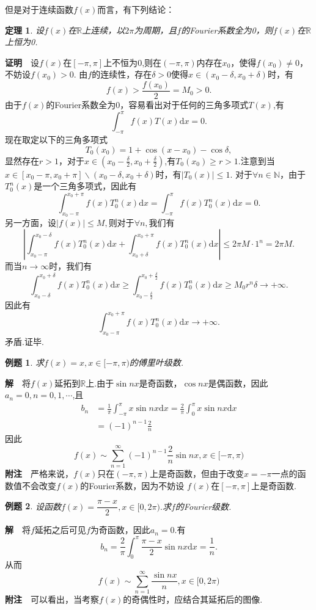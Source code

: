 \documentclass[UTF8]{article}
\newcommand{\R}{\mathbb{R}}
\newcommand{\dx}{\mathrm{d}x}
\newcommand{\zm}{\textbf{证明}$\quad$}
\newcommand{\jie}{\textbf{解}$\quad$}
\newcommand{\fz}{\textbf{附注}$\quad$}
\newtheorem{thm}{\hspace{2em}定理}[section]
\newtheorem{exa}{\hspace{2em}例题}[section]
\begin{document}
  但是对于连续函数$f(x)$而言，有下列结论：
  \begin{thm}
    设$f(x)$在$\R$上连续，以$2\pi$为周期，且$f$的Fourier系数全为0，则$f(x)$在$\R$上恒为0.
  \end{thm}
  \zm 设$f(x)$在$[-\pi,\pi]$上不恒为$0$,则在$(-\pi,\pi)$内存在$x_0$，使得$f(x_0)\ne 0$，不妨设$f(x_0)>0$.
  由$f$的连续性，存在$\delta>0$使得$x\in(x_0-\delta,x_0+\delta)$时，有
  $$f(x)>\frac{f(x_0)}{2}=M_0>0.$$
  由于$f(x)$的Fourier系数全为0，容易看出对于任何的三角多项式$T(x)$,有
  $$\int_{-\pi}^\pi f(x)T(x)\dx=0.$$
  现在取定以下的三角多项式
  $$T_0(x_0)=1+\cos(x-x_0)-\cos\delta,$$
  显然存在$r>1$，对于$x\in(x_0-\frac{\delta}{2},x_0+\frac{\delta}{2})$,有$T_0(x_0)\ge r>1.$注意到当
  $x\in[x_0-\pi,x_0+\pi]\backslash(x_0-\delta,x_0+\delta)$时，有$|T_0(x)|\le 1.$
  对于$\forall n\in \mathbb{N}$，由于$T_0^n(x)$是一个三角多项式，因此有
  $$\int_{x_0-\pi}^{x_0+\pi}f(x)T_0^n(x)\dx=\int_{-\pi}^\pi f(x)T_0^n(x)\dx=0.$$
  另一方面，设$|f(x)|\le M,$则对于$\forall n,$我们有
  $$\left|\int_{x_0-\pi}^{x_0-\delta}f(x)T_0^n(x)\dx+\int_{x_0+\delta}^{x_0+\pi}f(x)T_0^n(x)\dx\right|
  \le 2\pi M\cdot 1^n=2\pi M.$$
  而当$n\to\infty$时，我们有
  $$\int_{x_0-\delta}^{x_0+\delta}f(x)T_0^n(x)\dx\ge\int_{x_0-\frac{\delta}{2}}^{x_0+\frac{\delta}{2}}f(x)T_0^n(x)\dx
  \ge M_0r^n\delta\to+\infty.$$
  因此有
  $$\int_{x_0-\pi}^{x_0+\pi}f(x)T_0^n(x)\dx\to+\infty.$$
  矛盾.证毕.
  \begin{exa}
    求$f(x)=x,x\in[-\pi,\pi)$的傅里叶级数.
  \end{exa}
  \jie 将$f(x)$延拓到$\R$上.由于$\sin nx$是奇函数，$\cos nx$是偶函数，因此$a_n=0,n=0,1,\cdots$,且
  \begin{align*}
    b_n&=\frac{1}{\pi}\int_{-\pi}^\pi x\sin nx\dx=\frac{2}{\pi}\int_0^\pi x\sin nx\dx\\
    &=(-1)^{n-1}\frac{2}{n}
  \end{align*}
  因此
  $$f(x) \sim \sum_{n=1}^\infty(-1)^{n-1}\frac{2}{n}\sin nx,x\in[-\pi,\pi)$$
  \fz 严格来说，$f(x)$只在$(-\pi,\pi)$上是奇函数，但由于改变$x=-\pi$一点的函数值不会改变$f(x)$的Fourier系数，因为不妨设
  $f(x)$在$[-\pi,\pi]$上是奇函数.
  \begin{exa}
    设函数$f(x)=\dfrac{\pi-x}{2},x\in[0,2\pi).$求$f$的Fourier级数.
  \end{exa}
  \jie 将$f$延拓之后可见$f$为奇函数，因此$a_n=0$.有
  $$b_n=\frac{2}{\pi}\int_0^\pi\frac{\pi-x}{2}\sin nx\dx=\frac{1}{n}.$$
  从而
  $$f(x)\sim \sum_{n=1}^\infty\frac{\sin nx}{n},x\in[0,2\pi)$$
  \fz 可以看出，当考察$f(x)$的奇偶性时，应结合其延拓后的图像.
\end{document}
